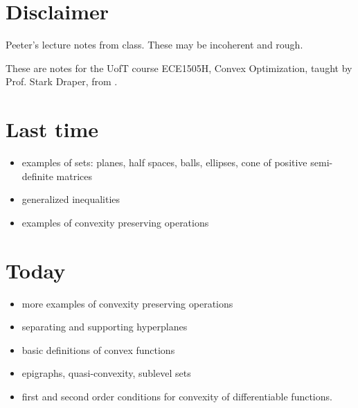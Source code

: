 
\renewcommand{\basename}{convexOptimization5}
\renewcommand{\dirname}{notes/ece1505/}
\newcommand{\keywords}{ECE1505H}


\usepackage{ece1505}
\usepackage{peeters_braket}
\usepackage{peeters_layout_exercise}
\usepackage{peeters_figures}
\usepackage{mathtools}
\usepackage{siunitx}
\usepackage{macros_cal}
\usepackage{enumerate}

\beginArtNoToc
{}
\label{chap:convexOptimization5}

\section{Disclaimer}

Peeter's lecture notes from class.  These may be incoherent and rough.

These are notes for the UofT course ECE1505H, Convex Optimization, taught by Prof. Stark Draper, from \citep{boyd2004convex}.

\section{Last time}

\begin{itemize}
\item examples of sets: planes, half spaces, balls, ellipses, cone of positive semi-definite matrices
\item generalized inequalities
\item examples of convexity preserving operations
\end{itemize}

\section{Today}

\begin{itemize}
\item more examples of convexity preserving operations
\item separating and supporting hyperplanes
\item basic definitions of convex functions
\item epigraphs, quasi-convexity, sublevel sets
\item first and second order conditions for convexity of differentiable functions.
\end{itemize}

